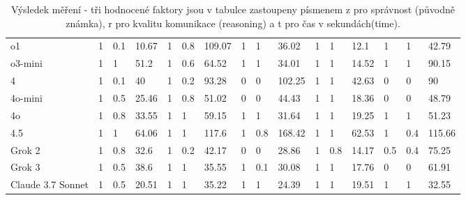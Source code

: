 \documentclass[czech,11pt,a4paper]{article}
\begin{document}
\begin{table}[H]
{\begin{tabular}{l|lll|lll|lll|lll|lll}
					o1 &           1 &            0.1 &  10.67 &           1 &            0.8 & 109.07 &           1 &              1 &  36.02 &           1 &              1 &   12.1 &           1 &              1 &  42.79 \\
					o3-mini &           1 &              1 &   51.2 &           1 &            0.6 &  64.52 &           1 &              1 &  34.01 &           1 &              1 &  14.52 &           1 &              1 &  90.15 \\
					4 &           1 &            0.1 &     40 &           1 &            0.2 &  93.28 &           0 &              0 & 102.25 &           1 &              1 &  42.63 &           0 &              0 &     90 \\
					4o-mini &           1 &            0.5 &  25.46 &           1 &            0.8 &  51.02 &           0 &              0 &  44.43 &           1 &              1 &  18.36 &           0 &              0 &  48.79 \\
					4o  &           1 &            0.8 &  33.55 &           1 &              1 &  59.15 &           1 &              1 &  31.64 &           1 &              1 &  19.25 &           1 &              1 &  51.23 \\
					4.5 &           1 &              1 &  64.06 &           1 &              1 &  117.6 &           1 &            0.8 & 168.42 &           1 &              1 &  62.53 &           1 &            0.4 & 115.66 \\
					Grok 2 &           1 &            0.8 &   32.6 &           1 &            0.2 &  42.17 &           0 &              0 &  28.86 &           1 &            0.8 &  14.17 &         0.5 &            0.4 &  75.25 \\
					Grok 3 &           1 &            0.5 &   38.6 &           1 &              1 &  35.55 &           1 &            0.1 &  30.08 &           1 &              1 &  17.76 &           0 &              0 &  61.91 \\
					Claude 3.7 Sonnet &           1 &            0.5 &  20.51 &           1 &              1 &  35.22 &           1 &              1 &  24.39 &           1 &              1 &  19.51 &           1 &              1 &  32.55 \\
				\end{tabular}}
				
				
				\caption{Výsledek měření - tři hodnocené faktory jsou v tabulce zastoupeny písmenem z pro správnost (původně známka), r pro kvalitu komunikace (reasoning) a t pro čas v sekundách(time).}
			\end{table}
\end{document}
